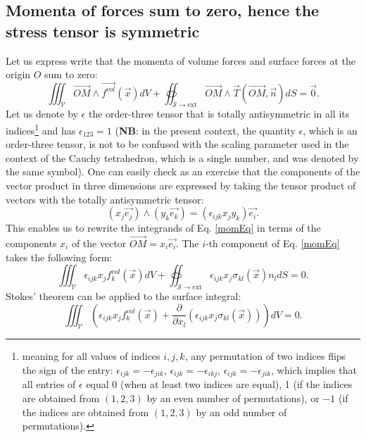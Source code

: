 \documentclass[DIV=12]{article}
\newcommand{\vol}{\mathcal{V}}
\newcommand{\sExt}{{{\mathcal{S}}\rightarrow{\mathrm{ext}}}}
\newcommand{\intVol}{\iiint}
\newcommand{\intSurf}{\oiint}
\newcommand{\fVol}{\overrightarrow{f^{vol}}}
\begin{document}
\subsection{Momenta of forces sum to zero, hence the stress tensor is symmetric}
 Let us express write that the momenta of volume forces and surface forces at the origin $O$ sum to zero:
\begin{equation}
 \intVol_\vol  \overrightarrow{OM} \wedge \fVol ( \vec{x})dV  + \intSurf_\sExt \overrightarrow{OM} \wedge \vec{T}(\overrightarrow{OM},\vec{n}) dS = \vec{0}.
\label{momEq}
\end{equation}
Let us denote by $\epsilon$ the order-three tensor that is totally antisymmetric 
 in all its indices\footnote{meaning for all values of indices $i,j,k$, any permutation of two indices flips the sign of the entry: 
 $\epsilon_{ijk} = -\epsilon_{jik}$,  $\epsilon_{ijk} = -\epsilon_{ikj}$, $\epsilon_{ijk} = -\epsilon_{jik}$, which implies that all 
 entries of $\epsilon$ equal 0 (when at least two indices are equal), 1 (if the indices are obtained from $(1,2,3)$ by an even number of permutations), 
or $-1$ (if the indices are obtained from $(1,2,3)$ by an odd number of permutations).} and has $\epsilon_{123}=1$ ({\bf{NB}}: in the present context, the 
 quantity $\epsilon$, which is an order-three tensor, is not to be confused with the scaling parameter used in the 
 context of the Cauchy tetrahedron, which is a single number, and was denoted by the same symbol). One can easily check
 as an exercise that the components of 
 the vector product in three dimensions are expressed by taking the tensor product of vectors with the totally antisymmetric tensor:
\begin{equation}
 ( x_j \vec{e_j} )\wedge ( y_k \vec{e_k} ) = (\epsilon_{ijk} x_j y_k) \vec{e_i}.
\label{vecProduct}
\end{equation}
 This enables us to rewrite the integrands of Eq. \ref{momEq} in terms 
 of the components $x_i$ of the vector $\overrightarrow{OM} = x_i\vec{e_i}$. The $i$-th component
 of Eq. \ref{momEq} takes the following form:
\begin{equation}
 \intVol_\vol \epsilon_{ijk} x_j f^{vol}_k ( \vec{x})dV  + \intSurf_\sExt   \epsilon_{ijk} x_j  \sigma_{kl}(\vec{x}) n_l dS = 0.
\label{momEq2}
\end{equation}
 Stokes' theorem can be applied to the surface integral:
\begin{equation}
 \intVol_\vol  \left( \epsilon_{ijk} x_j f^{vol}_k( \vec{x}) +\frac{\partial}{\partial x_l}\left( \epsilon_{ijk} x_j  \sigma_{kl}(\vec{x}) \right) \right) dV  = 0.
\label{momEq2}
\end{equation}
\end{document}
